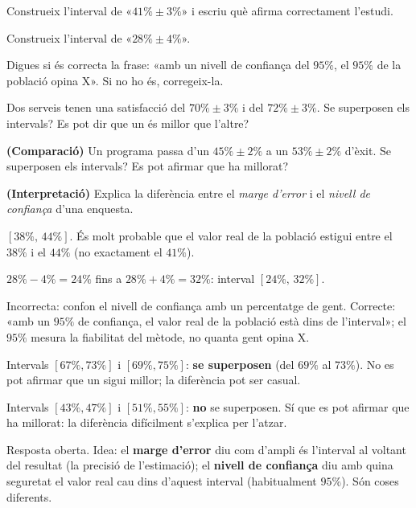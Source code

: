 \begin{exercicis}
\begin{exlist}
  \item Construeix l'interval de «$41\%\pm 3\%$» i escriu què afirma correctament l'estudi.
  \item Construeix l'interval de «$28\%\pm 4\%$».
  \item Digues si és correcta la frase: «amb un nivell de confiança del $95\%$, el $95\%$
        de la població opina X». Si no ho és, corregeix-la.
  \item Dos serveis tenen una satisfacció del $70\%\pm 3\%$ i del $72\%\pm 3\%$. Se
        superposen els intervals? Es pot dir que un és millor que l'altre?
  \item \textbf{(Comparació)} Un programa passa d'un $45\%\pm 2\%$ a un $53\%\pm 2\%$
        d'èxit. Se superposen els intervals? Es pot afirmar que ha millorat?
  \item \textbf{(Interpretació)} Explica la diferència entre el \emph{marge d'error} i el
        \emph{nivell de confiança} d'una enquesta.
\end{exlist}
\end{exercicis}

\begin{solucions}
\begin{sollist}
  \item $[38\%,\,44\%]$. És molt probable que el valor real de la població estigui entre el
        $38\%$ i el $44\%$ (no exactament el $41\%$).
  \item $28\%-4\%=24\%$ fins a $28\%+4\%=32\%$: interval $[24\%,\,32\%]$.
  \item Incorrecta: confon el nivell de confiança amb un percentatge de gent. Correcte:
        «amb un $95\%$ de confiança, el valor real de la població està dins de l'interval»;
        el $95\%$ mesura la fiabilitat del mètode, no quanta gent opina X.
  \item Intervals $[67\%,73\%]$ i $[69\%,75\%]$: \textbf{se superposen} (del $69\%$ al
        $73\%$). No es pot afirmar que un sigui millor; la diferència pot ser casual.
  \item Intervals $[43\%,47\%]$ i $[51\%,55\%]$: \textbf{no} se superposen. Sí que es pot
        afirmar que ha millorat: la diferència difícilment s'explica per l'atzar.
  \item Resposta oberta. Idea: el \textbf{marge d'error} diu com d'ampli és l'interval al
        voltant del resultat (la precisió de l'estimació); el \textbf{nivell de confiança}
        diu amb quina seguretat el valor real cau dins d'aquest interval (habitualment
        $95\%$). Són coses diferents.
\end{sollist}
\end{solucions}
